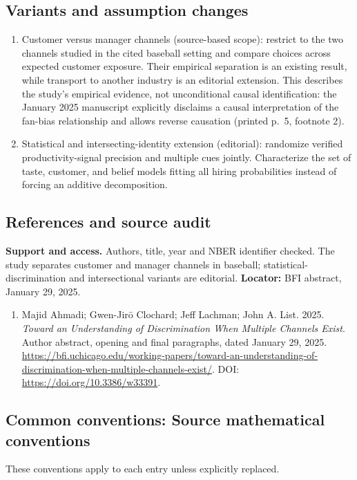 \documentclass[11pt,a4paper]{article}
\begin{document}
\subsection*{Variants and assumption changes}
\begin{enumerate}
\item Customer versus manager channels (source-based scope): restrict to the two channels studied in the cited baseball setting and compare choices across expected customer exposure. Their empirical separation is an existing result, while transport to another industry is an editorial extension. This describes the study's empirical evidence, not unconditional causal identification: the January 2025 manuscript explicitly disclaims a causal interpretation of the fan-bias relationship and allows reverse causation (printed p.~5, footnote 2).
\item Statistical and intersecting-identity extension (editorial): randomize verified productivity-signal precision and multiple cues jointly. Characterize the set of taste, customer, and belief models fitting all hiring probabilities instead of forcing an additive decomposition.
\end{enumerate}
\subsection*{References and source audit}
\textbf{Support and access.} Authors, title, year and NBER identifier checked. The study separates customer and manager channels in baseball; statistical-discrimination and intersectional variants are editorial. \textbf{Locator:} BFI abstract, January 29, 2025.
\begin{enumerate}\raggedright
\item\hypertarget{definitions:source:30007638:1}{} Majid Ahmadi; Gwen-Jir\={o} Clochard; Jeff Lachman; John A. List. 2025. \emph{Toward an Understanding of Discrimination When Multiple Channels Exist}. Author abstract, opening and final paragraphs, dated January 29, 2025.
\url{https://bfi.uchicago.edu/working-papers/toward-an-understanding-of-discrimination-when-multiple-channels-exist/}.
DOI: \url{https://doi.org/10.3386/w33391}.
\end{enumerate}

\subsection*{Common conventions: Source mathematical conventions}

These conventions apply to each entry unless explicitly replaced.
\end{document}
